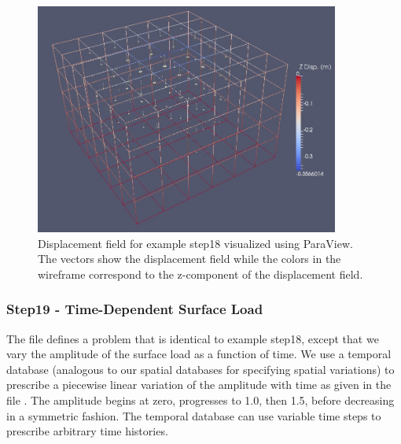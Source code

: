 \begin{figure}
  \includegraphics[width=10cm]{examples/figs/3dhex8_step18-displ}
  \caption{Displacement field for example step18 visualized using ParaView. The
    vectors show the displacement field while the colors in the wireframe
    correspond to the z-component of the displacement field.}
  \label{fig:example:3dhex8:step18:displacement}
\end{figure}


\subsubsection{Step19 - Time-Dependent Surface Load}

The  file defines a problem that is identical to
example step18, except that we vary the amplitude of the surface load
as a function of time. We use a temporal database (analogous to our
spatial databases for specifying spatial variations) to prescribe
a piecewise linear variation of the amplitude with time as given in
the file . The amplitude begins
at zero, progresses to 1.0, then 1.5, before decreasing in a symmetric
fashion. The temporal database can use variable time steps to prescribe
arbitrary time histories. 

